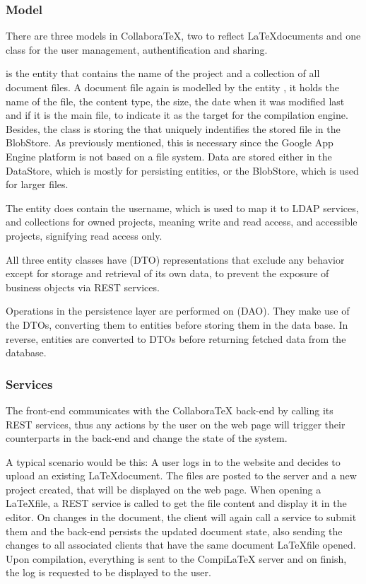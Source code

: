 \subsubsection{Model}
\label{subsubsec:collaboratex-model}
There are three models in CollaboraTeX, two to reflect \LaTeX documents and one class for the user management,  authentification and sharing.

 is the entity that contains the name of the project and a collection of all document files. A document file again is modelled by the entity , it holds the name of the file, the content type, the size, the date when it was modified last and if it is the main file, to indicate it as the target for the compilation engine. Besides, the class is storing the  that uniquely indentifies the stored file in the BlobStore. As previously mentioned, this is necessary since the Google App Engine platform is not based on a file system. Data are stored either in the DataStore, which is mostly for persisting entities, or the BlobStore, which is used for larger files.

The  entity does contain the username, which is used to map it to LDAP services, and collections for owned projects, meaning write and read access, and accessible projects, signifying read access only.
 
All three entity classes have  (DTO) representations that exclude any behavior except for storage and retrieval of its own data, to prevent the exposure of business objects via REST services.

Operations in the persistence layer are performed on  (DAO). They make use of the DTOs, converting them to entities before storing them in the data base. In reverse, entities are converted to DTOs before returning fetched data from the database.

\subsubsection{Services}
\label{subsubsec:collaboratex-services}
The front-end communicates with the CollaboraTeX back-end by calling its REST services, thus any actions by the user on the web page will trigger their counterparts in the back-end and change the state of the system.

A typical scenario would be this: A user logs in to the website and decides to upload an existing \LaTeX document. The files are posted to the server and a new project created, that will be displayed on the web page. When opening a \LaTeX file, a REST service is called to get the file content and display it in the editor. On changes in the document, the client will again call a service to submit them and the back-end persists the updated document state, also sending the changes to all associated clients that have the same document \LaTeX file opened. Upon compilation, everything is sent to the CompiLaTeX server and on finish, the log is requested to be displayed to the user.

